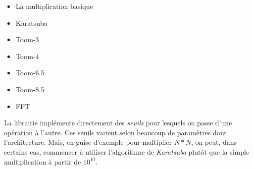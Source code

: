 \documentclass[letterpaper]{article}
\begin{document}
\begin{itemize}
  \item La multiplication basique
  \item Karatsuba
  \item Toom-3
  \item Toom-4
  \item Toom-6.5
  \item Toom-8.5
  \item FFT
\end{itemize}

La librairie implémente directement des \emph{seuils} pour lesquels
on passe d'une opération à l'autre. Ces seuils varient selon
beaucoup de paramètres dont l'architecture. Mais, en guise d'exemple
pour multiplier $N*N$, on peut, dans certains cas, commencer à utiliser
l'algorithme de \emph{Karatsuba} plutôt que la simple multiplication
à partir de $10^{10}$\cite{gmplibkaratsuba}.

\footnotesize


\end{document}
